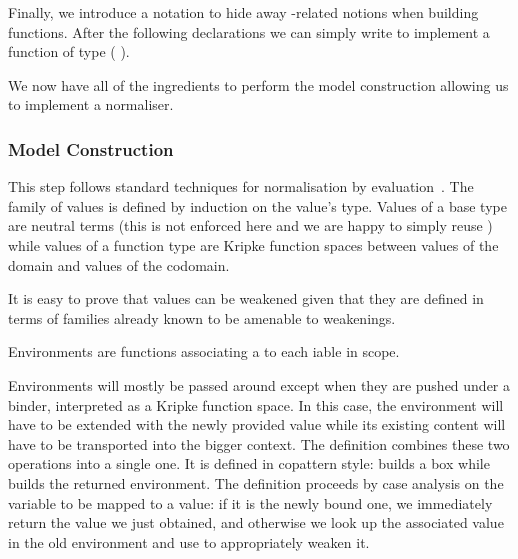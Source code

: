 
Finally, we introduce a notation to hide away -related
notions when building  functions.
%
After the following declarations we can simply write
\AIC{λλ[}  \AIC{,}  \AIC{]}  to implement a function of type
(   ).


We now have all of the ingredients to perform the model
construction allowing us to implement a normaliser.

\subsubsection{Model Construction}

This step follows standard techniques for normalisation
by evaluation~\cite{DBLP:conf/lics/BergerS91,DBLP:journals/mscs/CoquandD97,DBLP:journals/lisp/Coquand02}.
The family of values is defined by induction on the value's
type.
%
Values of a base type are neutral terms (this is not enforced here and
we are happy to simply reuse ) while values of a function type
are Kripke function spaces between values of the domain and values of
the codomain.


It is easy to prove that values can be weakened given that they are
defined in terms of families already known to be amenable to weakenings.


Environments are functions associating a 
to each iable in scope.


Environments will mostly be passed around except when they are pushed
under a binder, interpreted as a Kripke function space.
%
In this case, the environment will have to be extended with the newly
provided value while its existing content will have to be transported
into the bigger context.
%
The  definition combines these two operations into a single
one. It is defined in copattern style:
{} builds a box while {} builds the
returned environment. The definition proceeds by case analysis on the
variable to be mapped to a value: if it is the newly bound one, we
immediately return the value we just obtained, and otherwise we look
up the associated value in the old environment and use  to
appropriately weaken it.

